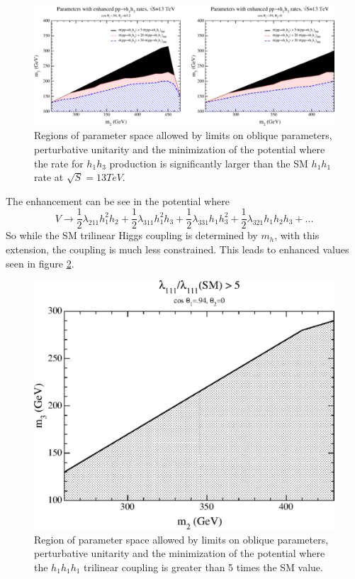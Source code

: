\begin{figure}[h]
\begin{center}
\includegraphics[scale=0.65]{figures/CompHiggsSing_Fig6}
\caption{Regions of parameter space allowed by limits on oblique parameters, perturbative unitarity and the minimization of the potential where the rate for ${h_{1}h_{3}}$ production is significantly larger than the SM ${h_{1}h_{1}}$ rate at ${\sqrt{S} = 13 TeV}$.}
\label{fig:CSH6}
\end{center}
\end{figure}


The enhancement can be see in the potential where 
\begin{equation}
V \rightarrow \frac{1}{2}\lambda_{211}h_{1}^{2}h_{2} + \frac{1}{2}\lambda_{311}h_{1}^{2}h_{3} + \frac{1}{2}\lambda_{331}h_{1}h_{3}^{2} + \frac{1}{2}\lambda_{321}h_{1}h_{2}h_{3} + . . .
\end{equation}
So while the SM trilinear Higgs coupling is determined by ${m_{h}}$, with this extension, the coupling is much less constrained. This leads to enhanced values seen in figure \ref{fig:CHS8}.
\begin{figure}[h]
\begin{center}
\includegraphics[scale=0.65]{figures/CompHiggsSing_Fig8}
\caption{Region of parameter space allowed by limits on oblique parameters, perturbative unitarity and the minimization of the potential where the ${h_{1}h_{1}h_{1}}$ trilinear coupling is greater than 5 times the SM value.}
\label{fig:CHS8}
\end{center}
\end{figure}

